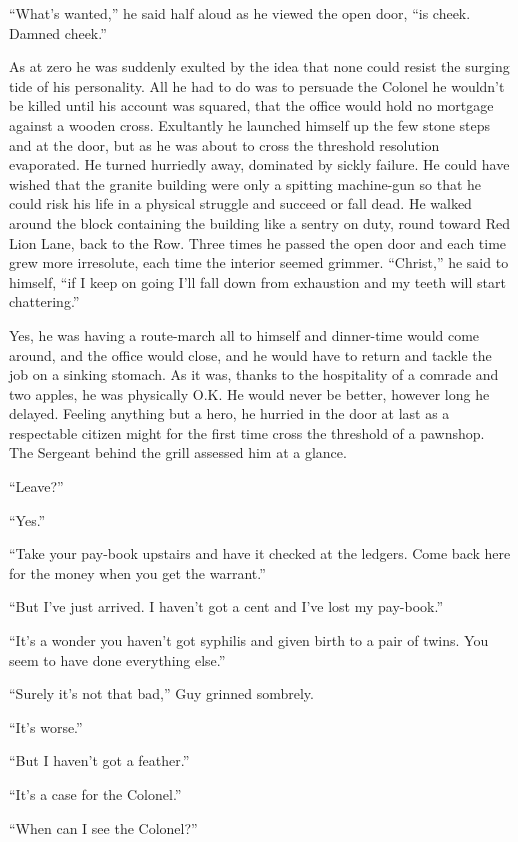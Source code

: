 ``What's wanted,'' he said half aloud as he viewed the open door, ``is cheek. Damned cheek.''

As at zero he was suddenly exulted by the idea that none could resist the surging tide of his personality. All he had to do was to persuade the Colonel he wouldn't be killed until his account was squared, that the office would hold no mortgage against a wooden cross. Exultantly he launched himself up the few stone steps and at the door, but as he was about to cross the threshold resolution evaporated. He turned hurriedly away, dominated by sickly failure. He could have wished that the granite building were only a spitting machine-gun so that he could risk his life in a physical struggle and succeed or fall dead. He walked around the block containing the building like a sentry on duty, round toward Red Lion Lane, back to the Row. Three times he passed the open door and each time grew more irresolute, each time the interior seemed grimmer. ``Christ,'' he said to himself, ``if I keep on going I'll fall down from exhaustion and my teeth will start chattering.''

Yes, he was having a route-march all to himself and dinner-time would come around, and the office would close, and he would have to return and tackle the job on a sinking stomach. As it was, thanks to the hospitality of a comrade and two apples, he was physically O.K. He would never be better, however long he delayed. Feeling anything but a hero, he hurried in the door at last as a respectable citizen might for the first time cross the threshold of a pawnshop. The Sergeant behind the grill assessed him at a glance.

``Leave?''

``Yes.''

``Take your pay-book upstairs and have it checked at the ledgers. Come back here for the money when you get the warrant.''

``But I've just arrived. I haven't got a cent and I've lost my pay-book.''

``It's a wonder you haven't got syphilis and given birth to a pair of twins. You seem to have done everything else.''

``Surely it's not that bad,'' Guy grinned sombrely.

``It's worse.''

``But I haven't got a feather.''

``It's a case for the Colonel.''

``When can I see the Colonel?''

